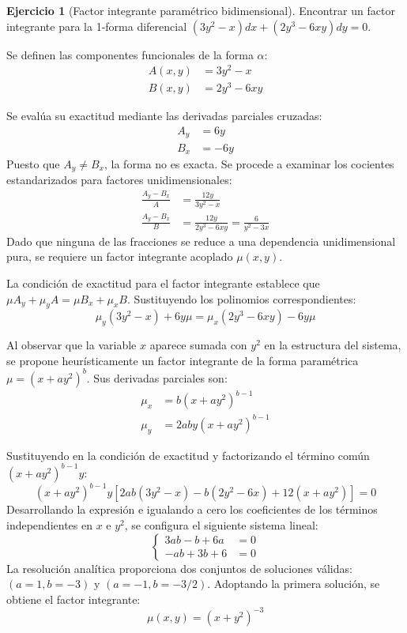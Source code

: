 \documentclass[11pt,a4paper]{article}
\theoremstyle{definition}
\newtheorem{exercise}{Ejercicio}[section]
\theoremstyle{plain}
\begin{document}
\begin{exercise}[Factor integrante paramétrico bidimensional]
Encontrar un factor integrante para la 1-forma diferencial $(3y^2 - x)dx + (2y^3 - 6xy)dy = 0$.
\end{exercise}

\begin{tcolorbox}
Se definen las componentes funcionales de la forma $\alpha$:
\begin{align*}
    A(x,y) &= 3y^2 - x \\
    B(x,y) &= 2y^3 - 6xy
\end{align*}

Se evalúa su exactitud mediante las derivadas parciales cruzadas:
\begin{align*}
    A_y &= 6y \\
    B_x &= -6y
\end{align*}
Puesto que $A_y \neq B_x$, la forma no es exacta. Se procede a examinar los cocientes estandarizados para factores unidimensionales:
\begin{align*}
    \frac{A_y - B_x}{A} &= \frac{12y}{3y^2 - x} \\
    \frac{A_y - B_x}{B} &= \frac{12y}{2y^3 - 6xy} = \frac{6}{y^2 - 3x}
\end{align*}
Dado que ninguna de las fracciones se reduce a una dependencia unidimensional pura, se requiere un factor integrante acoplado $\mu(x,y)$.

La condición de exactitud para el factor integrante establece que $\mu A_y + \mu_y A = \mu B_x + \mu_x B$. Sustituyendo los polinomios correspondientes:
$$ \mu_y(3y^2 - x) + 6y\mu = \mu_x(2y^3 - 6xy) - 6y\mu $$

Al observar que la variable $x$ aparece sumada con $y^2$ en la estructura del sistema, se propone heurísticamente un factor integrante de la forma paramétrica $\mu = (x + ay^2)^b$. Sus derivadas parciales son:
\begin{align*}
    \mu_x &= b(x + ay^2)^{b-1} \\
    \mu_y &= 2aby(x + ay^2)^{b-1}
\end{align*}

Sustituyendo en la condición de exactitud y factorizando el término común $(x + ay^2)^{b-1}y$:
$$ (x + ay^2)^{b-1}y [2ab(3y^2 - x) - b(2y^2 - 6x) + 12(x + ay^2)] = 0 $$
Desarrollando la expresión e igualando a cero los coeficientes de los términos independientes en $x$ e $y^2$, se configura el siguiente sistema lineal:
\[
\left\{
\begin{aligned}
    3ab - b + 6a &= 0 \\
    -ab + 3b + 6 &= 0
\end{aligned}
\right.
\]
La resolución analítica proporciona dos conjuntos de soluciones válidas: $(a=1, b=-3)$ y $(a=-1, b=-3/2)$. Adoptando la primera solución, se obtiene el factor integrante:
$$ \mu(x,y) = (x + y^2)^{-3} $$


\end{tcolorbox}
\end{document}
